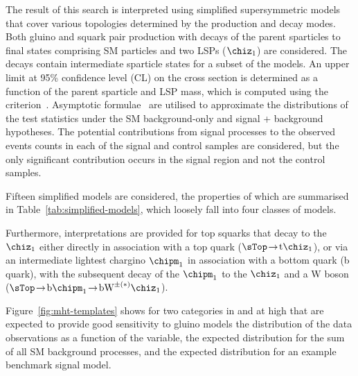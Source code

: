 The result of this search is interpreted using simplified
supersymmetric models~\cite{Alwall:2008ag, Alwall:2008va, sms} that
cover various topologies determined by the production and decay
modes. Both gluino and squark pair production with decays of the
parent sparticles to final states comprising SM particles and two LSPs
($\chiz_1$) are considered. The decays contain intermediate sparticle
states for a subset of the models. An upper limit at 95\% confidence
level (CL) on the cross section is determined as a function of the
parent sparticle and LSP mass, which is computed using the \cls
criterion~\cite{read,junk}. Asymptotic formulae~\cite{Cowan:2010js}
are utilised to approximate the distributions of the test statistics
under the SM background-only and signal + background hypotheses. 
The potential contributions from signal processes to the observed
events counts in each of the signal and control samples are
considered, but the only significant contribution occurs in the signal
region and not the control samples.

Fifteen simplified models are considered, the properties of which are
summarised in Table~\ref{tab:simplified-models}, which loosely fall
into four classes of models.



Furthermore, interpretations are provided for top squarks that decay
to the $\chiz_1$ either directly in association with a top quark
($\sTop\!  \rightarrow\! \text{t} \chiz_1$), or via an intermediate
lightest chargino $\chipm_1$ in association with a bottom quark (b
quark), with the subsequent decay of the $\chipm_1$ to the $\chiz_1$
and a W boson ($\sTop\!  \rightarrow\! \text{b} \chipm_1\!
\rightarrow\!  \text{bW}^{\pm(*)} \chiz_1$).


Figure~\ref{fig:mht-templates} shows for two categories in \njet and
\nb at high \scalht that are expected to provide good sensitivity to
gluino models the distribution of the data observations as a function
of the \mht variable, the expected distribution for the sum of all SM
background processes, and the expected distribution for an example
benchmark signal model.

